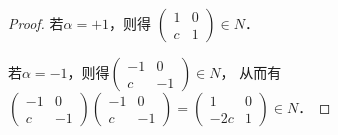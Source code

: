 \begin{proof}
    
    若$\alpha=+1$，则得 $\left(\begin{smallmatrix} 1 & 0 \\ c & 1 \end{smallmatrix}\right) \in N$．
    
    若$\alpha=-1$，则得$\left(\begin{smallmatrix} -1 & 0 \\ c & -1\end{smallmatrix}\right) \in N$，
    从而有$\left(\begin{smallmatrix} -1 & 0 \\ c & -1\end{smallmatrix}\right)
    \left(\begin{smallmatrix} -1 & 0 \\ c & -1\end{smallmatrix}\right)
    =\left(\begin{smallmatrix}  1 & 0 \\ -2c & 1 \end{smallmatrix}\right)\in N$．
    

\end{proof}
